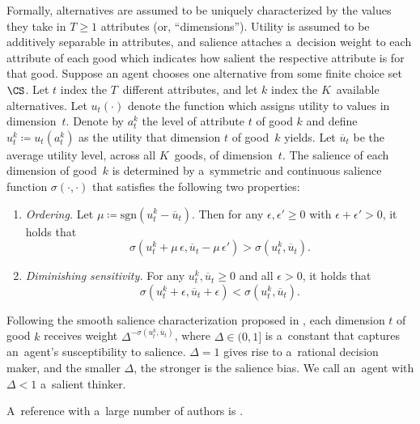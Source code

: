 Formally, alternatives are assumed to be uniquely characterized by the values they take in ${T \geq 1}$ attributes (or, ``dimensions''). Utility is assumed to be additively separable in attributes, and salience attaches a~decision weight to each attribute of each good which indicates how salient the respective attribute is for that good. Suppose an agent chooses one alternative from some finite choice set $\CS$. Let $t$ index the $T$~different attributes, and let $k$ index the $K$~available alternatives. Let $u_t(\cdot)$ denote the function which assigns utility to values in dimension~$t$.
Denote by $a^k_{t}$ the level of attribute $t$ of good $k$ and define ${u^k_t \coloneqq u_t(a^k_t)}$ as the utility that dimension $t$ of good~$k$ yields. Let $\overline{u}_t$ be the average utility level, across all $K$~goods, of dimension~$t$. The salience of each dimension of good~$k$ is determined by a~symmetric and continuous salience function ${\sigma(\cdot, \cdot)}$ that satisfies the following two properties:
\begin{enumerate}
\item \emph{Ordering.} Let ${\mu \coloneqq \mathrm{sgn}(u^k_t - \overline{u}_t)}$. Then for any ${\epsilon,\epsilon' \geq 0}$ with ${\epsilon + \epsilon' > 0}$, it holds that~
\begin{equation}
	\sigma(u^k_t + \mu\,\epsilon, \overline{u}_t - \mu\,\epsilon') > \sigma (u^k_t,\overline{u}_t).
\end{equation}
\item \emph{Diminishing sensitivity.} For any ${u^k_t, \overline{u}_t \geq 0}$ and all ${\epsilon > 0}$, it holds that
\begin{equation}
	\sigma(u^k_t + \epsilon, \overline{u}_t + \epsilon) < \sigma(u^k_t,\overline{u}_t).
\end{equation}
\end{enumerate}

Following the smooth salience characterization proposed in \cite[p.\,1255]{Bordalo2012}, each dimension $t$ of good $k$ receives weight $\Delta^{-\sigma(u^k_t, \overline{u}_t)}$, where ${\Delta \in (0, 1]}$ is a~constant that captures an~agent's susceptibility to salience. ${\Delta = 1}$ gives rise to a~rational decision maker, and the smaller $\Delta$, the stronger is the salience bias. We call an~agent with ${\Delta < 1}$ a~salient thinker.

A~reference with a~large number of authors is \cite{Henrich2005}.